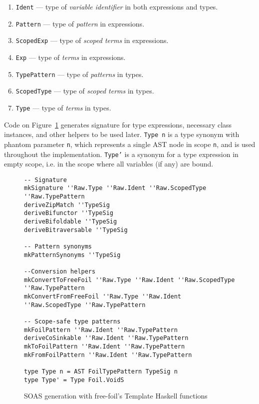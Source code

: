 \begin{enumerate}
  \item \texttt{Ident} — type of \textit{variable identifier} in both expressions and types.
  \item \texttt{Pattern} — type of \textit{pattern} in expressions.
  \item \texttt{ScopedExp} — type of \textit{scoped terms} in expressions.
  \item \texttt{Exp} — type of \textit{terms} in expressions.
  \item \texttt{TypePattern} — type of \textit{patterns} in types.
  \item \texttt{ScopedType} — type of \textit{scoped terms} in types.
  \item \texttt{Type} — type of \textit{terms} in types.
\end{enumerate}

Code on Figure~\ref{fig:soas-gen} generates signature for type expressions, necessary class instances, and other helpers to be used later. \texttt{Type n} is a type synonym with phantom parameter \texttt{n}, which represents a single AST node in scope \texttt{n}, and is used throughout the implementation. \texttt{Type'} is a synonym for a type expression in empty scope, i.e. in the scope where all variables (if any) are bound.

\begin{figure}[H]
\begin{verbatim}
-- Signature
mkSignature ''Raw.Type ''Raw.Ident ''Raw.ScopedType ''Raw.TypePattern
deriveZipMatch ''TypeSig
deriveBifunctor ''TypeSig
deriveBifoldable ''TypeSig
deriveBitraversable ''TypeSig

-- Pattern synonyms
mkPatternSynonyms ''TypeSig

--Conversion helpers
mkConvertToFreeFoil ''Raw.Type ''Raw.Ident ''Raw.ScopedType ''Raw.TypePattern
mkConvertFromFreeFoil ''Raw.Type ''Raw.Ident ''Raw.ScopedType ''Raw.TypePattern

-- Scope-safe type patterns
mkFoilPattern ''Raw.Ident ''Raw.TypePattern
deriveCoSinkable ''Raw.Ident ''Raw.TypePattern
mkToFoilPattern ''Raw.Ident ''Raw.TypePattern
mkFromFoilPattern ''Raw.Ident ''Raw.TypePattern

type Type n = AST FoilTypePattern TypeSig n
type Type' = Type Foil.VoidS
\end{verbatim}
  \caption{SOAS generation with free-foil's Template Haskell functions}
  \label{fig:soas-gen}
\end{figure}

